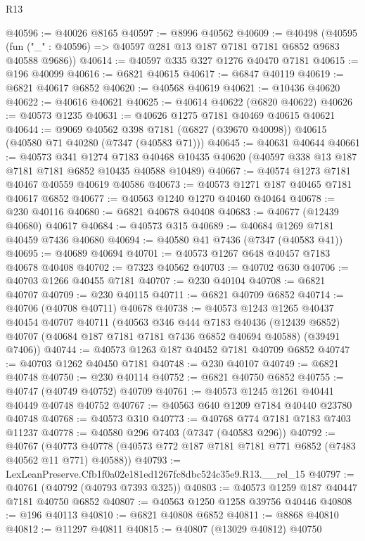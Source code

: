 \begin{lexlean}{R13}
\begin{coremodule}
@40596 := @40026 @8165
@40597 := @8996 @40562
@40609 := @40498
    (@40595 (fun ("_" : @40596) => @40597 @281 @13 @187 @7181 @7181 @6852 @9683 @40588 @9686))
@40614 := @40597 @335 @327 @1276 @40470 @7181
@40615 := @196 @40099
@40616 := @6821 @40615
@40617 := @6847 @40119
@40619 := @6821 @40617 @6852
@40620 := @40568 @40619
@40621 := @10436 @40620
@40622 := @40616 @40621
@40625 := @40614 @40622 (@6820 @40622)
@40626 := @40573 @1235
@40631 := @40626 @1275 @7181 @40469 @40615 @40621
@40644 := @9069
    @40562
    @398
    @7181
    (@6827 (@39670 @40098))
    @40615
    (@40580 @71 @40280 (@7347 (@40583 @71)))
@40645 := @40631 @40644
@40661 := @40573
    @341
    @1274
    @7183
    @40468
    @10435
    @40620
    (@40597 @338 @13 @187 @7181 @7181 @6852 @10435 @40588 @10489)
@40667 := @40574 @1273 @7181 @40467 @40559 @40619 @40586
@40673 := @40573 @1271 @187 @40465 @7181 @40617 @6852
@40677 := @40563 @1240 @1270 @40460 @40464
@40678 := @230 @40116
@40680 := @6821 @40678 @40408
@40683 := @40677 (@12439 @40680) @40617
@40684 := @40573 @315
@40689 := @40684 @1269 @7181 @40459 @7436 @40680
@40694 := @40580 @41 @7436 (@7347 (@40583 @41))
@40695 := @40689 @40694
@40701 := @40573 @1267 @648 @40457 @7183 @40678 @40408
@40702 := @7323 @40562
@40703 := @40702 @630
@40706 := @40703 @1266 @40455 @7181
@40707 := @230 @40104
@40708 := @6821 @40707
@40709 := @230 @40115
@40711 := @6821 @40709 @6852
@40714 := @40706 (@40708 @40711) @40678
@40738 := @40573
    @1243
    @1265
    @40437
    @40454
    @40707
    @40711
    (@40563
      @346
      @444
      @7183
      @40436
      (@12439 @6852)
      @40707
      (@40684 @187 @7181 @7181 @7436 @6852 @40694 @40588)
      (@39491 @7406))
@40744 := @40573 @1263 @187 @40452 @7181 @40709 @6852
@40747 := @40703 @1262 @40450 @7181
@40748 := @230 @40107
@40749 := @6821 @40748
@40750 := @230 @40114
@40752 := @6821 @40750 @6852
@40755 := @40747 (@40749 @40752) @40709
@40761 := @40573 @1245 @1261 @40441 @40449 @40748 @40752
@40767 := @40563 @640 @1209 @7184 @40440 @23780 @40748
@40768 := @40573 @310
@40773 := @40768 @774 @7181 @7183 @7403 @11237
@40778 := @40580 @296 @7403 (@7347 (@40583 @296))
@40792 := @40767
    (@40773 @40778 (@40573 @772 @187 @7181 @7181 @771 @6852 (@7483 @40562 @11 @771) @40588))
@40793 := LexLeanPreserve.Cfb1f0a02e181ed1267fc8dbc524c35e9.R13.__rel_15
@40797 := @40761 (@40792 (@40793 @7393 @325))
@40803 := @40573 @1259 @187 @40447 @7181 @40750 @6852
@40807 := @40563 @1250 @1258 @39756 @40446
@40808 := @196 @40113
@40810 := @6821 @40808 @6852
@40811 := @8868 @40810
@40812 := @11297 @40811
@40815 := @40807 (@13029 @40812) @40750

\end{coremodule}
\end{lexlean}
